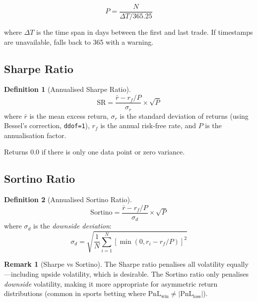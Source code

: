 \documentclass[12pt,a4paper]{report}
\theoremstyle{definition}
\newtheorem{definition}{Definition}[chapter]
\newtheorem{remark}{Remark}[chapter]
\newcommand{\code}[1]{\texttt{#1}}
\newcommand{\pnl}{\text{PnL}}
\begin{document}
\begin{equation}
    P = \frac{N}{\Delta T / 365.25}
\end{equation}

where $\Delta T$ is the time span in days between the first and last trade. If timestamps are unavailable, falls back to 365 with a warning.

\subsection{Sharpe Ratio}
\label{sec:sharpe}

\begin{definition}[Annualised Sharpe Ratio]
\begin{equation}
    \text{SR} = \frac{\bar{r} - r_f / P}{\sigma_r} \times \sqrt{P}
    \label{eq:sharpe}
\end{equation}
where $\bar{r}$ is the mean excess return, $\sigma_r$ is the standard deviation of returns (using Bessel's correction, \code{ddof=1}), $r_f$ is the annual risk-free rate, and $P$ is the annualisation factor.
\end{definition}

Returns 0.0 if there is only one data point or zero variance.

\subsection{Sortino Ratio}
\label{sec:sortino}

\begin{definition}[Annualised Sortino Ratio]
\begin{equation}
    \text{Sortino} = \frac{\bar{r} - r_f / P}{\sigma_d} \times \sqrt{P}
    \label{eq:sortino}
\end{equation}
where $\sigma_d$ is the \emph{downside deviation}:
\begin{equation}
    \sigma_d = \sqrt{\frac{1}{N} \sum_{i=1}^{N} \left[\min(0, r_i - r_f/P)\right]^2}
    \label{eq:downside-dev}
\end{equation}
\end{definition}

\begin{remark}[Sharpe vs Sortino]
The Sharpe ratio penalises all volatility equally—including upside volatility, which is desirable. The Sortino ratio only penalises \emph{downside} volatility, making it more appropriate for asymmetric return distributions (common in sports betting where $\pnl_{\text{win}} \neq |\pnl_{\text{loss}}|$).
\end{remark}
\end{document}
